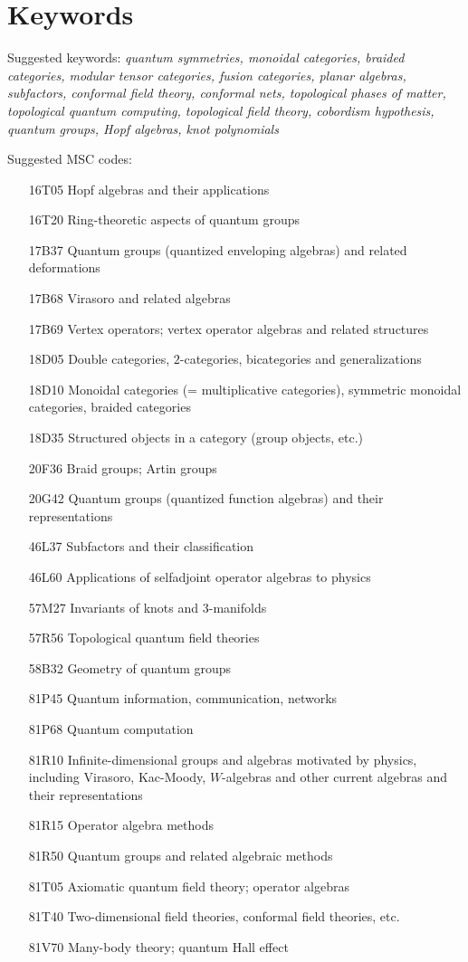 \documentclass[12pt]{article}
\begin{document}
\section{Keywords}
Suggested keywords:
\emph{
quantum symmetries, monoidal categories, braided categories, modular tensor categories, fusion categories, planar algebras, subfactors, conformal field theory, conformal nets, topological phases of matter, topological quantum computing, topological field theory, cobordism hypothesis, quantum groups, Hopf algebras, knot polynomials}

Suggested MSC codes:
\begin{itemize}
  \setlength{\itemsep}{1pt}
  \setlength{\parskip}{0pt}
  \setlength{\parsep}{0pt}
\item[16T05] Hopf algebras and their applications
\item[16T20] Ring-theoretic aspects of quantum groups
\item[17B37] Quantum groups (quantized enveloping algebras) and related deformations
\item[17B68] Virasoro and related algebras
\item[17B69] Vertex operators; vertex operator algebras and related structures
\item[18D05] Double categories, $2$-categories, bicategories and generalizations
\item[18D10] Monoidal categories (= multiplicative categories), symmetric monoidal categories, braided categories
\item[18D35] Structured objects in a category (group objects, etc.)
\item[20F36] Braid groups; Artin groups
\item[20G42] Quantum groups (quantized function algebras) and their representations
\item[46L37] Subfactors and their classification
\item[46L60] Applications of selfadjoint operator algebras to physics
\item[57M27] Invariants of knots and 3-manifolds
\item[57R56] Topological quantum field theories
\item[58B32] Geometry of quantum groups
\item[81P45] Quantum information, communication, networks
\item[81P68] Quantum computation
\item[81R10] Infinite-dimensional groups and algebras motivated by physics, including Virasoro, Kac-Moody, $W$-algebras and other current algebras and their representations
\item[81R15] Operator algebra methods
\item[81R50] Quantum groups and related algebraic methods
\item[81T05] Axiomatic quantum field theory; operator algebras
\item[81T40] Two-dimensional field theories, conformal field theories, etc.
\item[81V70] Many-body theory; quantum Hall effect
\end{itemize}
\end{document}
